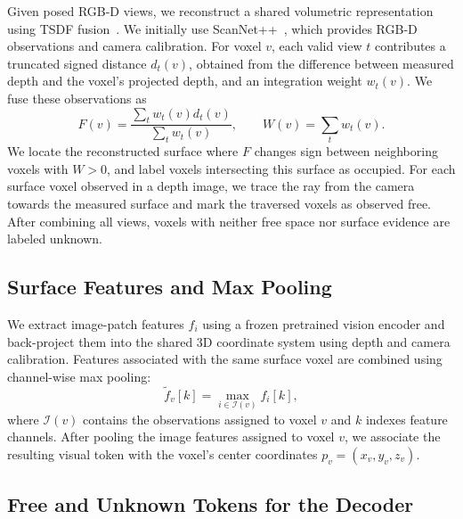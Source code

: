 \documentclass[10pt,twocolumn,letterpaper]{article}
\begin{document}
Given posed RGB-D views, we reconstruct a shared volumetric representation using TSDF fusion~\cite{curless}. We initially use ScanNet++~\cite{scannetpp}, which provides RGB-D observations and camera calibration. For voxel $v$, each valid view $t$ contributes a truncated signed distance $d_t(v)$, obtained from the difference between measured depth and the voxel's projected depth, and an integration weight $w_t(v)$. We fuse these observations as
\begin{equation}
F(v)=\frac{\sum_t w_t(v)d_t(v)}{\sum_t w_t(v)},\qquad
W(v)=\sum_t w_t(v).
\end{equation}
We locate the reconstructed surface where $F$ changes sign between neighboring voxels with $W>0$, and label voxels intersecting this surface as occupied. For each surface voxel observed in a depth image, we trace the ray from the camera towards the measured surface and mark the traversed voxels as observed free. After combining all views, voxels with neither free space nor surface evidence are labeled unknown. 

\subsection{Surface Features and Max Pooling}

We extract image-patch features $f_i$ using a frozen pretrained vision encoder and back-project them into the shared 3D coordinate system using depth and camera calibration. Features associated with the same surface voxel are combined using channel-wise max pooling:
\begin{equation}
\tilde f_v[k]=\max_{i\in\mathcal I(v)} f_i[k],
\end{equation}
where $\mathcal I(v)$ contains the observations assigned to voxel $v$ and $k$ indexes feature channels. After pooling the image features assigned to voxel $v$, we associate the resulting visual token with the voxel's center coordinates $p_v = (x_v, y_v, z_v)$.

\subsection{Free and Unknown Tokens for the Decoder}
\end{document}
